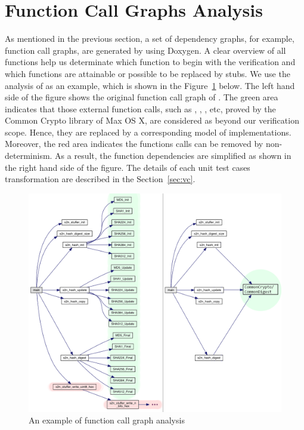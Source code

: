
\section{Function Call Graphs Analysis}
As mentioned in the previous section, a set of dependency graphs, for example, function call graphs, are generated by using Doxygen. A clear overview of all functions help us determinate which function to begin with the verification and which functions are attainable or possible to be replaced by stubs. We use the analysis of  as an example, which is shown in the Figure~\ref{fig:aeoffcga} below. The left hand side of the figure shows the original function call graph of . The green area indicates that those external function calls, such as , , , etc, proved by the Common Crypto library of Max OS X, are considered as beyond our verification scope. Hence, they are replaced by a corresponding model of  implementations. Moreover, the red area indicates the functions calls can be removed by non-determinism. As a result, the function dependencies are simplified as shown in the right hand side of the figure. The details of each unit test cases transformation are described in the Section~\ref{sec:vc}. 

\begin{figure}[t]
    \centering
    \includegraphics[width=\textwidth]{./contents/images/s2n_hash_test}
    \caption{An example of function call graph analysis}
    \label{fig:aeoffcga}
\end{figure}


